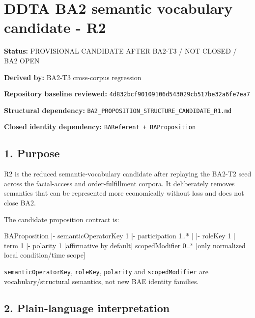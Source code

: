 \documentclass[
  10pt,
  a4paper,
]{article}
\author{}
\date{}
\newenvironment{Shaded}{}{}
\newcommand{\NormalTok}[1]{#1}
\begin{document}
\section{DDTA BA2 semantic vocabulary candidate -
R2}\label{ddta-ba2-semantic-vocabulary-candidate---r2}

\textbf{Status:} PROVISIONAL CANDIDATE AFTER BA2-T3 / NOT CLOSED / BA2
OPEN

\textbf{Derived by:} BA2-T3 cross-corpus regression

\textbf{Repository baseline reviewed:}
\texttt{4d832bcf90109106d543029cb517be32a6fe7ea7}

\textbf{Structural dependency:}
\texttt{BA2\_PROPOSITION\_STRUCTURE\_CANDIDATE\_R1.md}

\textbf{Closed identity dependency:}
\texttt{BAReferent\ +\ BAProposition}

\subsection{1. Purpose}\label{1-purpose}

R2 is the reduced semantic-vocabulary candidate after replaying the
BA2-T2 seed across the facial-access and order-fulfillment corpora. It
deliberately removes semantics that can be represented more economically
without loss and does not close BA2.

The candidate proposition contract is:

\begin{Shaded}
\begin{Highlighting}[]
\NormalTok{BAProposition}
\NormalTok{|{-} semanticOperatorKey   1}
\NormalTok{|{-} participation         1..*}
\NormalTok{|    |{-} roleKey          1}
\NormalTok{|    \textasciigrave{}{-} term             1}
\NormalTok{|{-} polarity              1       [affirmative by default]}
\NormalTok{\textasciigrave{}{-} scopedModifier        0..*    [only normalized local condition/time scope]}
\end{Highlighting}
\end{Shaded}

\texttt{semanticOperatorKey}, \texttt{roleKey}, \texttt{polarity} and
\texttt{scopedModifier} are vocabulary/structural semantics, not new BAE
identity families.

\subsection{2. Plain-language
interpretation}\label{2-plain-language-interpretation}
\end{document}

